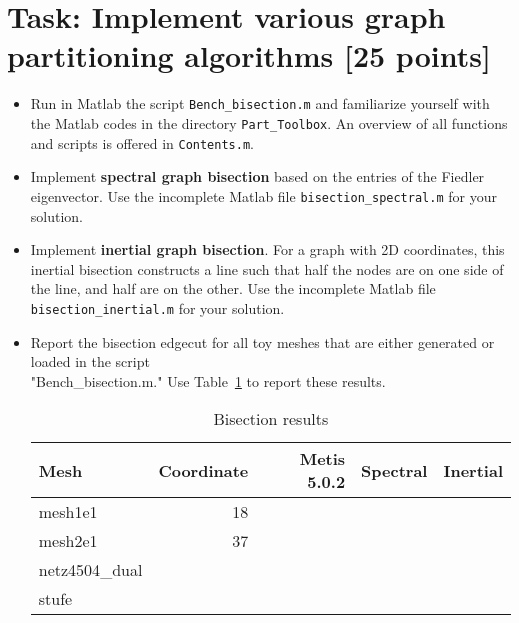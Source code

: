 \documentclass[unicode,11pt,a4paper,oneside,numbers=endperiod,openany]{scrartcl}
\begin{document}
\section{Task: Implement various graph partitioning algorithms [25 points]}


\begin{itemize}

\item Run in Matlab the script \texttt{Bench\_bisection.m} and familiarize yourself with the Matlab codes in the directory \texttt{Part\_Toolbox}. An overview of all functions and scripts is offered in \texttt{Contents.m}. 

\item Implement \textbf{spectral graph bisection} based on the entries of the Fiedler eigenvector. Use the incomplete Matlab file \texttt{bisection\_spectral.m} for your solution.

\item Implement \textbf{inertial graph bisection}. For a graph with 2D coordinates, this inertial bisection constructs a line such that half the nodes are on one side of the line, and half are on the other.
Use the incomplete Matlab file \texttt{bisection\_inertial.m} for your solution.
 
\item Report the bisection edgecut for all toy meshes that are either generated or loaded in the script \\ "Bench\_bisection.m." Use Table~\ref{table:bisection} to report these results.

\begin{table}[h]
\caption{Bisection results}
\centering
\begin{tabular}{l|r|r|r|r} \hline\hline 
Mesh             &  Coordinate           & Metis 5.0.2  & Spectral & Inertial  \\ \hline
mesh1e1          &   18                   &             &          &           \\             
mesh2e1          &   37                   &             &          &           \\ 
netz4504\_dual   &                        &             &          &           \\ 
stufe            &                        &             &          &           \\ 
\hline \hline
\end{tabular}
\label{table:bisection}
\end{table}

\end{itemize}
\end{document}
